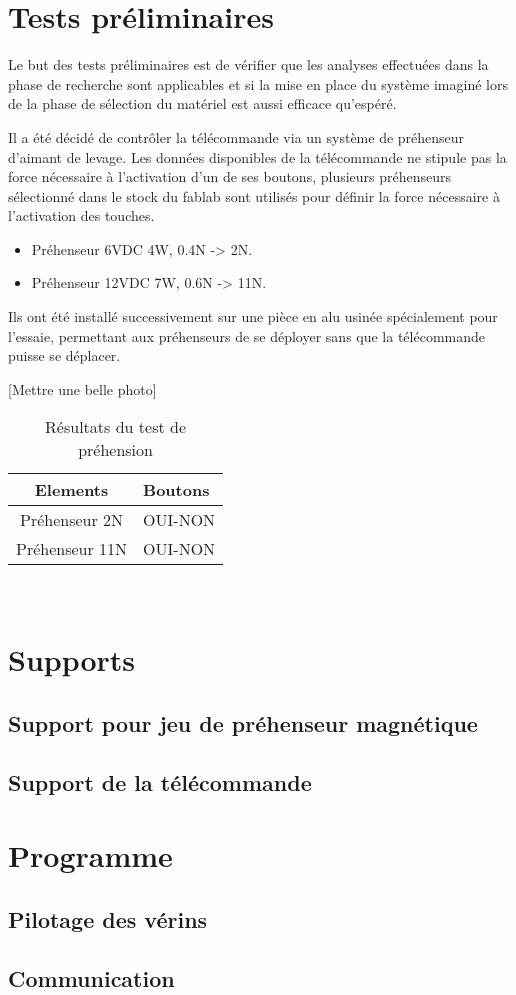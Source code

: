 \section{Tests préliminaires}
Le but des tests préliminaires est de vérifier que les analyses effectuées dans la phase de recherche sont applicables et si la mise en
place du système imaginé lors de la phase de sélection du matériel est aussi efficace qu'espéré.

Il a été décidé de contrôler la télécommande via un système de préhenseur d'aimant de levage. Les données disponibles de la télécommande
ne stipule pas la force nécessaire à l'activation d'un de ses boutons, plusieurs préhenseurs sélectionné dans le stock du \Gls{fablab}
sont utilisés pour définir la force nécessaire à l'activation des touches.

\begin{itemize}
    \item Préhenseur 6VDC 4W, 0.4N -> 2N.
    \item Préhenseur 12VDC 7W, 0.6N -> 11N.
\end{itemize}

Ils ont été installé successivement sur une pièce en alu usinée spécialement pour l'essaie, permettant aux préhenseurs de se déployer
sans que la télécommande puisse se déplacer.

[Mettre une belle photo]

\begin{table}[h]
    \begin{center}
        \caption{Résultats du test de préhension}
        \begin{tabular}{|c|l|}
            Elements       & Boutons \\ \hline
            Préhenseur 2N  & OUI-NON \\
            Préhenseur 11N & OUI-NON \\
        \end{tabular}
    \end{center}
\end{table}\\

\section{Supports}

\subsection{Support pour jeu de préhenseur magnétique}
\subsection{Support de la télécommande}

\section{Programme}
\subsection{Pilotage des vérins}
\subsection{Communication}
